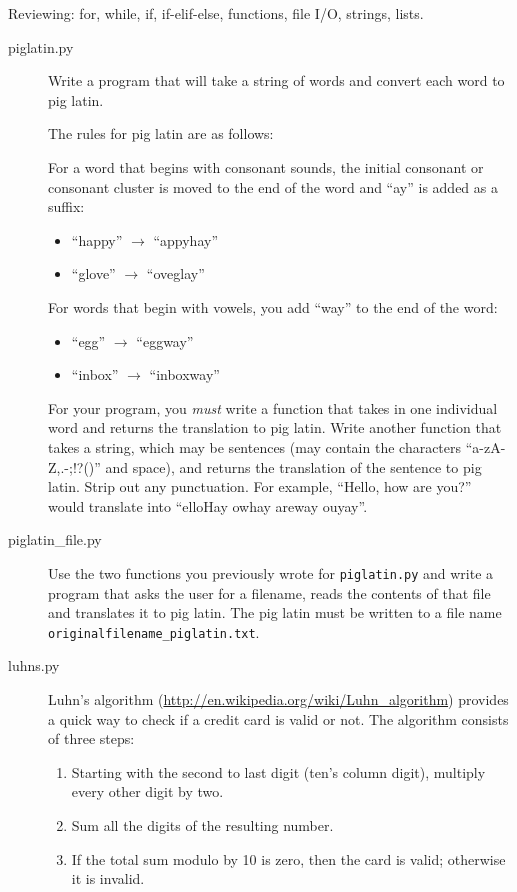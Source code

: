 \documentclass[11pt]{cselabheader}
\begin{document}
Reviewing: for, while, if, if-elif-else, functions, file I/O, strings, lists. 

\begin{description}
  \item[piglatin.py] Write a program that will take a string of words and
    convert each word to pig latin. 

    The rules for pig latin are as follows:

    For a word that begins with consonant sounds, the initial consonant or
    consonant cluster is moved to the end of the word and ``ay'' is added as a
    suffix:
    \begin{itemize}
      \item ``happy'' $\to$ ``appyhay''
      \item ``glove'' $\to$ ``oveglay''
    \end{itemize}

    For words that begin with vowels, you add ``way'' to the end of the word:
    \begin{itemize}
      \item ``egg'' $\to$ ``eggway''
      \item ``inbox'' $\to$ ``inboxway''
    \end{itemize}

    For your program, you \emph{must} write a function that takes in one
    individual word and returns the translation to pig latin. Write another
    function that takes a string, which may be sentences (may contain the
    characters ``a-zA-Z,.-;!?()'' and space), and returns the translation of the
    sentence to pig latin. Strip out any punctuation. For example, ``Hello, how
    are you?'' would translate into ``elloHay owhay areway ouyay''.

  \item[piglatin\_file.py] Use the two functions you previously wrote for
    \texttt{piglatin.py} and write a program that asks the user for a filename,
    reads the contents of that file and translates it to pig latin. The pig
    latin must be written to a file name
    \texttt{originalfilename\_piglatin.txt}.

  \item[luhns.py] Luhn's algorithm
    (\url{http://en.wikipedia.org/wiki/Luhn_algorithm}) provides a quick way to
    check if a credit card is valid or not. The algorithm consists of three
    steps:

    \begin{enumerate}
      \item Starting with the second to last digit (ten's column digit),
        multiply every other digit by two.
      \item Sum all the digits of the resulting number.
      \item If the total sum modulo by 10 is zero, then the card is valid;
        otherwise it is invalid.
    \end{enumerate}


\end{description}
\end{document}
